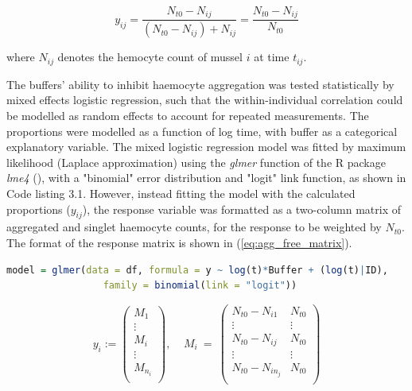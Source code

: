 \begin{equation}
    \label{eq: proportion_agg}
    y_{ij} = \dfrac{N_{t0} - N_{ij}}{(N_{t0} - N_{ij}) + N_{ij}} = \dfrac{N_{t0} - N_{ij}}{N_{t0}}
\end{equation}

\noindent where $N_{ij}$ denotes the hemocyte count of mussel $i$ at time $t_{ij}$.

The buffers' ability to inhibit haemocyte aggregation was tested statistically by mixed effects logistic regression, such that the within-individual correlation could be modelled as random effects to account for repeated measurements. The proportions were modelled as a function of log time, with buffer as a categorical explanatory variable. The mixed logistic regression model was fitted by maximum likelihood (Laplace approximation) using the \emph{glmer} function of the R package \emph{lme4} (\cite{lme4}), with a "binomial" error distribution and "logit" link function, as shown in Code listing 3.1. However, instead fitting the model with the calculated proportions ($y_{ij}$), the response variable was formatted as a two-column matrix of aggregated and singlet haemocyte counts, for the response to be weighted by $N_{t0}$. The format of the response matrix is shown in (\ref{eq:agg_free_matrix}).

\begin{lstlisting}[language=R, caption = {The R source code run to fit the logistic proportion aggregation model.}]
model = glmer(data = df, formula = y ~ log(t)*Buffer + (log(t)|ID),
                 family = binomial(link = "logit"))
\end{lstlisting}

\begin{equation}
    \label{eq:agg_free_matrix}
    y_{i} := \begin{pmatrix}
     M_{1} \\
     \vdots \\
     M_{i} \\
     \vdots \\
     M_{n_{i}} \\
    \end{pmatrix}
    , \; \; \; \; M_{i} \: = \:
    \begin{pmatrix}
      N_{t0} - N_{i1}     &  N_{t0} \\
      \vdots              &  \vdots \\
      N_{t0} - N_{ij}     &  N_{t0} \\
      \vdots              & \vdots \\
      N_{t0} - N_{in_{j}} &  N_{t0} \\      
    \end{pmatrix}
\end{equation}

